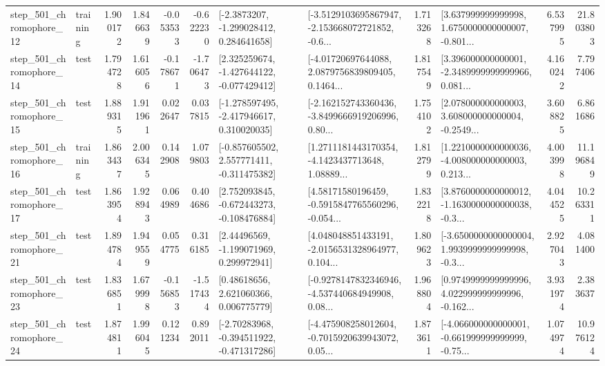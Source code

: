 \begin{tabular}{llrrrrllrlrr}
  step\_501\_chromophore\_12 &  training &      1.900172 &    1.846639 &     -0.053533 & -0.622230 &     [-2.3873207, -1.299028412, 0.284641658] &  [-3.5129103695867947, -2.153668072721852, -0.6... &       1.713268 &  [3.637999999999998, 1.6750000000000007, -0.801... &            6.537995 &         21.803803 \\
  step\_501\_chromophore\_14 &      test &      1.794728 &    1.616056 &     -0.178671 & -1.706473 &   [2.325259674, -1.427644122, -0.077429412] &  [-4.01720697644088, 2.0879756839809405, 0.1464... &       1.817549 &  [3.396000000000001, -2.3489999999999966, 0.081... &            4.160242 &          7.797406 \\
  step\_501\_chromophore\_15 &      test &      1.889315 &    1.911961 &      0.022647 &  0.037815 &   [-1.278597495, -2.417946617, 0.310020035] &  [-2.162152743360436, -3.8499666919206996, 0.80... &       1.754102 &  [2.078000000000003, 3.608000000000004, -0.2549... &            3.608825 &          6.861686 \\
  step\_501\_chromophore\_16 &  training &      1.863437 &    2.006345 &      0.142908 &  1.079803 &   [-0.857605502, 2.557771411, -0.311475382] &  [1.2711181443170354, -4.1423437713648, 1.08889... &       1.812799 &  [1.2210000000000036, -4.008000000000003, 0.213... &            4.003998 &         11.196849 \\
  step\_501\_chromophore\_17 &      test &      1.863954 &    1.928943 &      0.064989 &  0.404686 &   [2.752093845, -0.672443273, -0.108476884] &  [4.58171580196459, -0.5915847765560296, -0.054... &       1.832218 &  [3.8760000000000012, -1.1630000000000038, -0.3... &            4.044525 &         10.263311 \\
  step\_501\_chromophore\_21 &      test &      1.894784 &    1.949559 &      0.054775 &  0.316185 &     [2.44496569, -1.199071969, 0.299972941] &  [4.048048851433191, -2.0156531328964977, 0.104... &       1.809623 &  [-3.6500000000000004, 1.9939999999999998, -0.3... &            2.927043 &          4.081400 \\
  step\_501\_chromophore\_23 &      test &      1.836851 &    1.679998 &     -0.156853 & -1.517434 &      [0.48618656, 2.621060366, 0.006775779] &  [-0.9278147832346946, -4.537440684949908, 0.08... &       1.968804 &  [0.9749999999999996, 4.022999999999996, -0.162... &            3.931974 &          2.383637 \\
  step\_501\_chromophore\_24 &      test &      1.874811 &    1.996045 &      0.121234 &  0.892011 &   [-2.70283968, -0.394511922, -0.471317286] &  [-4.475908258012604, -0.7015920639943072, 0.05... &       1.873611 &  [-4.066000000000001, -0.661999999999999, -0.75... &            1.074974 &         10.976124 \\

\end{tabular}
